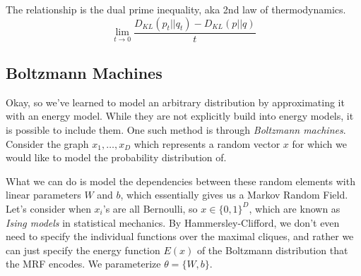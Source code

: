   The relationship is the dual prime inequality, aka 2nd law of thermodynamics. 
  \begin{equation}
    \lim_{t \rightarrow 0} \frac{D_{KL}(p_t || q_t) - D_{KL}(p||q)}{t}
  \end{equation}
  
\subsection{Boltzmann Machines}  

  Okay, so we've learned to model an arbitrary distribution by approximating it with an energy model. While they are not explicitly build into energy models, it is possible to include them. One such method is through \textit{Boltzmann machines}. Consider the graph $x_1, \ldots, x_D$ which represents a random vector $x$ for which we would like to model the probability distribution of. 
  \begin{center}
  \end{center}
  What we can do is model the dependencies between these random elements with linear parameters $W$ and $b$, which essentially gives us a Markov Random Field. Let's consider when $x_i$'s are all Bernoulli, so $x \in \{0, 1\}^D$, which are known as \textit{Ising models} in statistical mechanics. By Hammersley-Clifford, we don't even need to specify the individual functions over the maximal cliques, and rather we can just specify the energy function $E(x)$ of the Boltzmann distribution that the MRF encodes. We parameterize $\theta = \{W, b\}$. 

